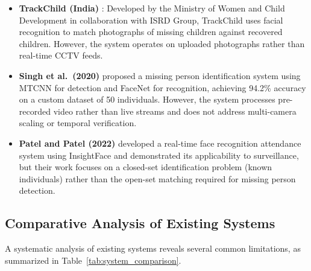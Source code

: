\documentclass[12pt, a4paper]{article}
\begin{document}
\begin{itemize}[leftmargin=*]
    \item \textbf{TrackChild (India)} \cite{isrd2018}: Developed by the Ministry of Women and Child Development in collaboration with ISRD Group, TrackChild uses facial recognition to match photographs of missing children against recovered children. However, the system operates on uploaded photographs rather than real-time CCTV feeds.
    
    \item \textbf{Singh et al.\ (2020)} \cite{singh2020} proposed a missing person identification system using MTCNN for detection and FaceNet for recognition, achieving 94.2\% accuracy on a custom dataset of 50 individuals. However, the system processes pre-recorded video rather than live streams and does not address multi-camera scaling or temporal verification.
    
    \item \textbf{Patel and Patel (2022)} \cite{patel2022} developed a real-time face recognition attendance system using InsightFace and demonstrated its applicability to surveillance, but their work focuses on a closed-set identification problem (known individuals) rather than the open-set matching required for missing person detection.
\end{itemize}

\subsection{Comparative Analysis of Existing Systems}

A systematic analysis of existing systems reveals several common limitations, as summarized in Table~\ref{tab:system_comparison}.
\end{document}
